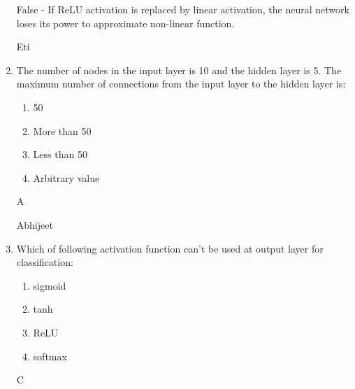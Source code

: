 \begin{enumerate}
    \begin{soln}
    False - If ReLU activation is replaced by linear activation, the neural network loses its power to approximate non-linear function.

 
    \end{soln}
    
    \begin{qauthor}
    Eti  
    \end{qauthor}
    
    
    \item The number of nodes in the input layer is 10 and the hidden layer is 5. The maximum number of connections from the input layer to the hidden layer is:
\begin{enumerate}
 \item 50

 \item More than 50

 \item Less than 50

  \item Arbitrary value
 \end{enumerate}    
    
    
     \begin{soln}
    
      A
 
    \end{soln}
    
    \begin{qauthor}
    Abhijeet 
    \end{qauthor}
    
    
        \item     Which of following activation function can’t be used at output layer for classification:
    \begin{enumerate}
     \item sigmoid
    
     \item tanh
    
     \item ReLU
    
      \item softmax
     \end{enumerate}    
    
    
     \begin{soln}
    
      C
 
    \end{soln}
    

\end{enumerate}
